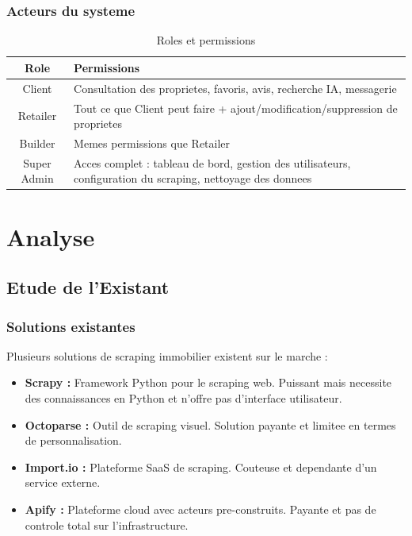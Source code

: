 \documentclass[12pt,a4paper]{report}
\begin{document}
\section{Acteurs du systeme}

\begin{table}[H]
\centering
\begin{tabular}{|c|p{10cm}|}
\hline
\textbf{Role} & \textbf{Permissions} \\
\hline
Client & Consultation des proprietes, favoris, avis, recherche IA, messagerie \\
\hline
Retailer & Tout ce que Client peut faire + ajout/modification/suppression de proprietes \\
\hline
Builder & Memes permissions que Retailer \\
\hline
Super Admin & Acces complet : tableau de bord, gestion des utilisateurs, configuration du scraping, nettoyage des donnees \\
\hline
\end{tabular}
\caption{Roles et permissions}
\end{table}

\part{Analyse}

\chapter{Etude de l'Existant}

\section{Solutions existantes}

Plusieurs solutions de scraping immobilier existent sur le marche :

\begin{itemize}
  \item \textbf{Scrapy :} Framework Python pour le scraping web. Puissant mais necessite des connaissances en Python et n'offre pas d'interface utilisateur.
  \item \textbf{Octoparse :} Outil de scraping visuel. Solution payante et limitee en termes de personnalisation.
  \item \textbf{Import.io :} Plateforme SaaS de scraping. Couteuse et dependante d'un service externe.
  \item \textbf{Apify :} Plateforme cloud avec acteurs pre-construits. Payante et pas de controle total sur l'infrastructure.
\end{itemize}
\end{document}
